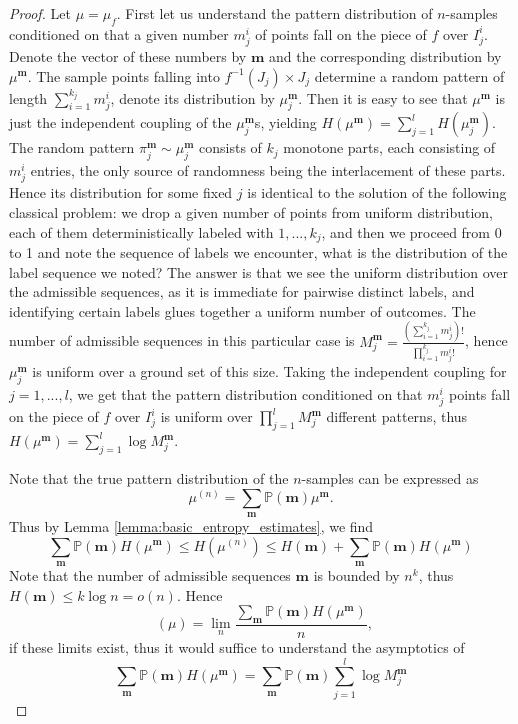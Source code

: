 \documentclass[11pt]{article}
\newcommand{\linent}{\mathop{H^{\mathrm{lin}}}}
\theoremstyle{definition}
\begin{document}
\begin{proof}
    Let $\mu=\mu_f$. First let us understand the pattern distribution of $n$-samples conditioned on that a given number $m_j^i$ of points fall on the piece of $f$ over $I_j^i$. Denote the vector of these numbers by $\mathbf{m}$ and the corresponding distribution by $\mu^{\mathbf{m}}$. The sample points falling into $f^{-1}(J_j)\times J_j$ determine a random pattern of length $\sum_{i=1}^{k_j} m_j^i$, denote its distribution by $\mu^{\mathbf{m}}_j$. Then it is easy to see that $\mu^{\mathbf{m}}$ is just the independent coupling of the $\mu^{\mathbf{m}}_j$s, yielding $H(\mu^{\mathbf{m}}) = \sum_{j=1}^{l}H(\mu^{\mathbf{m}}_j)$. The random pattern $\pi^{\mathbf{m}}_j\sim \mu^{\mathbf{m}}_j$ consists of $k_j$ monotone parts, each consisting of $m_j^i$ entries, the only source of randomness being the interlacement of these parts. Hence its distribution for some fixed $j$ is identical to the solution of the following classical problem: we drop a given number of points from uniform distribution, each of them deterministically labeled with $1, ..., k_j$, and then we proceed from 0 to 1 and note the sequence of labels we encounter, what is the distribution of the label sequence we noted? The answer is that we see the uniform distribution over the admissible sequences, as it is immediate for pairwise distinct labels, and identifying certain labels glues together a uniform number of outcomes. The number of admissible sequences in this particular case is $M_j^{\mathbf{m}} = \frac{(\sum_{i=1}^{k_j}m_j^i)!}{\prod_{i=1}^{k_j}m_j^i!}$, hence $\mu^{\mathbf{m}}_j$ is uniform over a ground set of this size. Taking the independent coupling for $j=1, ..., l$, we get that the pattern distribution conditioned on that $m_j^i$ points fall on the piece of $f$ over $I_j^i$ is uniform over $\prod_{j=1}^l M_j^{\mathbf{m}}$ different patterns, thus $H(\mu^{\mathbf{m}})=\sum_{j=1}^l\log M_j^{\mathbf{m}}$.

    Note that the true pattern distribution of the $n$-samples can be expressed as
    $$\mu^{(n)} = \sum_{\mathbf{m}}\mathbb{P}(\mathbf{m})\mu^{\mathbf{m}}.$$
    Thus by Lemma \ref{lemma:basic_entropy_estimates}, we find
    \begin{equation}\label{eq:piecewise_lin_convex_comb_ineq_invoked}
    \sum_{\mathbf{m}}\mathbb{P}(\mathbf{m})H(\mu^{\mathbf{m}})\leq H(\mu^{(n)})\leq H(\mathbf{m}) + \sum_{\mathbf{m}}\mathbb{P}(\mathbf{m})H(\mu^{\mathbf{m}})
    \end{equation}
    Note that the number of admissible sequences $\mathbf{m}$ is bounded by $n^k$, thus $H(\mathbf{m})\leq k\log n=o(n)$. Hence
    $$\linent(\mu)= \lim_n \frac{\sum_{\mathbf{m}}\mathbb{P}(\mathbf{m})H(\mu^{\mathbf{m}})}{n},$$
    if these limits exist, thus it would suffice to understand the asymptotics of 
    \begin{equation} \label{eq:decomp_piecewise_lin_ent}
    \sum_{\mathbf{m}}\mathbb{P}(\mathbf{m})H(\mu^{\mathbf{m}})=\sum_{\mathbf{m}}\mathbb{P}(\mathbf{m})\sum_{j=1}^l\log M_j^{\mathbf{m}}
    \end{equation}


\end{proof}
\end{document}
